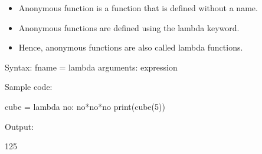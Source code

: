 \setlength{\columnsep}{3pt}

\begin{flushleft}

	\begin{itemize}
		\item Anonymous function is a function that is defined without a name.

		\item Anonymous
functions are defined using the lambda keyword.

		\item Hence, anonymous functions are also called lambda functions.
	\end{itemize}

		\begin{tcolorbox}[breakable,notitle,boxrule=1pt,colback=pink,colframe=pink]
		\color{black}
		\font=8pt
		Syntax: 
		\newline
		fname = lambda arguments: expression
		\font=4pt
	\end{tcolorbox}			
		
	Sample code:
	\begin{tcolorbox}[breakable,notitle,boxrule=-0pt,colback=black,colframe=black]
		\color{green}
		\font=9pt
		cube = lambda no: no*no*no \newline
		print(cube(5))
		\font=4pt
	\end{tcolorbox}
	
	Output:
	\begin{tcolorbox}[breakable,notitle,boxrule=-0pt,colback=output,colframe=output]
		\color{black}
		125
		\font=4pt
	\end{tcolorbox}
	
	
\end{flushleft}


\newpage



